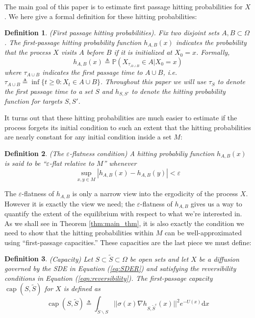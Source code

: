\documentclass[12pt, nofootinbib,english, amsmath, amssymb, aps, priprint, graphicx,floatfix]{revtex4-1}
\newtheorem{definition}{Definition}
\theoremstyle{plain}
\theoremstyle{definition}
\theoremstyle{plain}
\begin{document}
The main goal of this paper is to estimate first passage hitting probabilities for $X$.  We here give a formal definition for these hitting probabilities: 

\begin{definition}(First passage hitting probabilities).  Fix two disjoint sets $A,B\subset \Omega$.  The first-passage hitting probability function $h_{A,B}(x)$ indicates the probability that the process $X$ visits $A$ before $B$ if it is initialized at $X_0=x$.  Formally,
\[ h_{A, B}(x) \triangleq \mathbb{P}(X_{\tau_{A\cup B}}\in A|X_0=x)\]
where $\tau_{A\cup B}$ indicates the first passage time to $A\cup B$, i.e.\ $\tau_{A\cup B} \triangleq \inf \{ t \geqslant 0 : X_t \in A \cup B \}$.  Throughout this paper we will use $\tau_S$ to denote the first passage time to a set $S$ and $h_{S,S'}$ to denote the hitting probability function for targets $S,S'$. 
\end{definition}

It turns out that these hitting probabilities are much easier to estimate if the process forgets its initial condition to such an extent that the hitting probabilities are nearly constant for any initial condition inside a set $M$:
\begin{definition}(The $\varepsilon$-flatness condition)  A hitting probabiliy function $h_{A,B}(x)$ is said to be  
``$\varepsilon$-flat relative to $M$'' whenever
\[
\sup_{x, y \in M} |h_{A,B}(x) - h_{A,B}(y)| < \varepsilon
\]
\end{definition}
The $\varepsilon$-flatness of $h_{A,B}$ is only a narrow view into the ergodicity of the process $X$.  However it is exactly the view we need; the $\varepsilon$-flatness of $h_{A,B}$ gives us a way to quantify the extent of the equilibrium with respect to what we're interested in.  As we shall see in Theorem \ref{thm:main_thm}, it is also exactly the condition we need to show that the hitting probabilities within $M$ can be well-approximated using ``first-passage capacities.''  These capacities are the last piece we must define:

\begin{definition}(Capacity)
Let $S \subset \tilde{S} \subset \Omega$ be open sets and let $X$ be a diffusion governed by the SDE in Equation (\ref{eq:SDER}) and satisfying the reversibility conditions in Equation (\ref{eqn:reversibility}).  The first-passage capacity $\ensuremath{\operatorname{cap}} (S, \tilde{S})$ for $X$ is defined as 
%
\[ \ensuremath{\operatorname{cap}} (S, \tilde{S}) \triangleq \int_{\tilde S \backslash S}
||\sigma(x) \nabla h_{S, \tilde{S}^c}(x)||^2 e^{- U(x)} \mathrm{d} x \]
%  
\end{definition}
\end{document}
